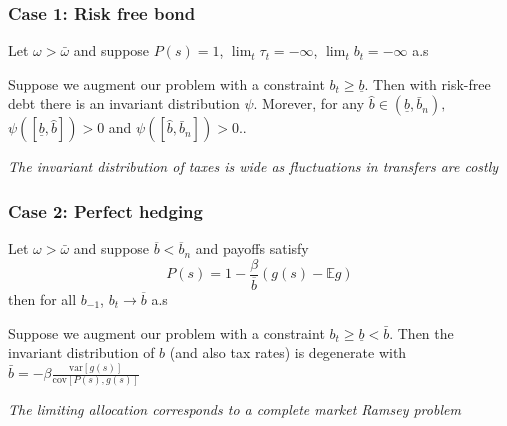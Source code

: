 \documentclass{beamer}
\newcommand{\var}{\mathrm{var}}
\newcommand{\cov}{\mathrm{cov}}
\begin{document}
\begin{frame}
 \frametitle{Case 1: Risk free bond}
\begin{theorem}
Let $\omega>\bar{\omega}$ and  suppose $P(s)=1$, $\lim_t \tau_t=-\infty$, $\lim_t b_t=-\infty$     a.s
\end{theorem}

\vspace{3mm}

\begin{corollary} Suppose we augment our problem with a constraint $b_{t}\geq \underline{b}.$ Then with risk-free debt there is an invariant distribution $\psi .$ Morever, for any $\hat{b}\in \left( \underline{b},\bar{b}_n\right) ,$ $\psi \left( \left[ \underline{b},\hat{b}%
\right] \right) >0$ and $\psi \left( \left[ \hat{b},\bar{b}_n\right] \right)
>0.$. 
\end{corollary}


\vspace{3mm}
\emph{\color{red}The invariant distribution of taxes is wide as fluctuations in transfers are costly}

\end{frame}



\begin{frame}
 \frametitle{Case 2: Perfect hedging}
\begin{theorem}
Let $\omega>\bar{\omega}$ and suppose $\overline b < \overline b_n$ and payoffs satisfy
\[P(s) = 1- \frac{\beta}{\overline b}(g(s) - \mathbb{E} g)\] 
			 then for all $b_{-1}$, $b_t\rightarrow \overline b $ a.s 
\end{theorem}


\begin{corollary} Suppose we augment our problem with a constraint $b_{t}\geq \underline{b}<\bar{b}.$ Then the invariant distribution of $b$ (and also tax rates) is degenerate with $\bar{b}=-\beta\frac{\var[g(s)]}{\cov[P(s),g(s)]}$ 
\end{corollary}


\emph{\color{red} The limiting allocation corresponds to a complete market Ramsey problem}
\end{frame}
\end{document}
